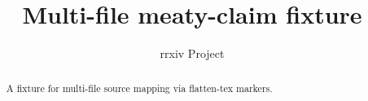 \documentclass{rrxiv}
\title{Multi-file meaty-claim fixture}
\author{rrxiv Project}
\begin{document}
\maketitle

\begin{abstract}
A fixture for multi-file source mapping via flatten-tex markers.
\end{abstract}


\end{document}
